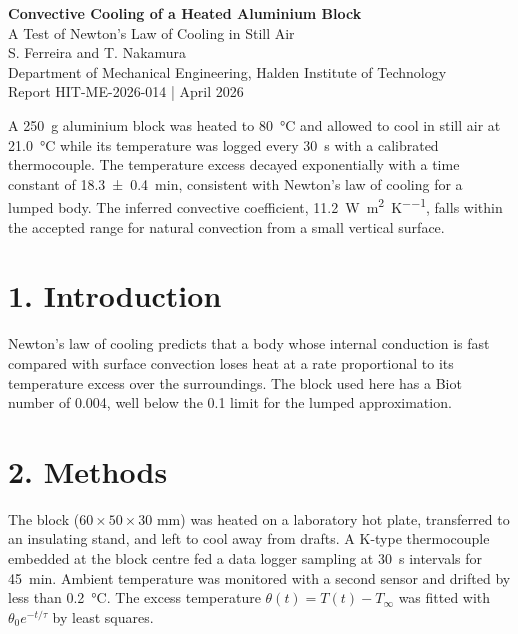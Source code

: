 \documentclass[10pt]{article}
\begin{document}
\begin{center}
  {\LARGE\bfseries Convective Cooling of a Heated Aluminium Block}\\[0.4em]
  {\large A Test of Newton's Law of Cooling in Still Air}\\[0.5em]
  S. Ferreira and T. Nakamura\\
  Department of Mechanical Engineering, Halden Institute of Technology\\
  Report HIT-ME-2026-014 \quad |  April 2026
\end{center}

\begin{tcolorbox}[colback=accent!6, colframe=accent, boxrule=0.8pt,
  title=\textbf{Abstract}, left=6pt, right=6pt, top=4pt, bottom=4pt]
A \SI{250}{\gram} aluminium block was heated to \SI{80}{\celsius} and allowed
to cool in still air at \SI{21.0}{\celsius} while its temperature was logged
every \SI{30}{\second} with a calibrated thermocouple. The temperature excess
decayed exponentially with a time constant of \SI{18.3\pm0.4}{\minute},
consistent with Newton's law of cooling for a lumped body. The inferred
convective coefficient, \SI{11.2}{\watt\per\metre\squared\per\kelvin}, falls
within the accepted range for natural convection from a small vertical surface.
\end{tcolorbox}

\section*{1. Introduction}
Newton's law of cooling predicts that a body whose internal conduction is fast
compared with surface convection loses heat at a rate proportional to its
temperature excess over the surroundings. The block used here has a Biot
number of 0.004, well below the 0.1 limit for the lumped approximation.

\section*{2. Methods}
The block ($60 \times 50 \times 30$ \si{\milli\metre}) was heated on a laboratory hot
plate, transferred to an insulating stand, and left to cool away from drafts.
A K-type thermocouple embedded at the block centre fed a data logger sampling
at \SI{30}{\second} intervals for \SI{45}{\minute}. Ambient temperature was
monitored with a second sensor and drifted by less than \SI{0.2}{\celsius}.
The excess temperature $\theta(t) = T(t) - T_\infty$ was fitted with
$\theta_0 e^{-t/\tau}$ by least squares.
\end{document}
